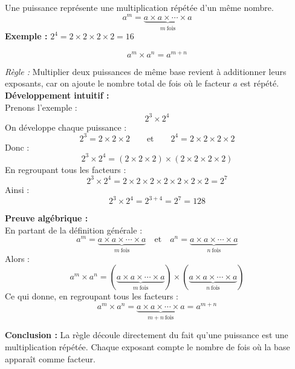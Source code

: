 \documentclass[11pt,a4paper]{article}
\newcommand{\rulebox}[3]{
\begin{tcolorbox}[colback=#1!10!white,colframe=#1!60!black,title=\textbf{#2}]
#3
\end{tcolorbox}
}
\begin{document}
\rulebox{orange}{Définition d’une puissance}{
Une puissance représente une multiplication répétée d’un même nombre.\\[0.2cm]
\[
a^m = \underbrace{a \times a \times \cdots \times a}_{m\ \text{fois}}
\]
\textbf{Exemple : } $2^4 = 2\times2\times2\times2 = 16$
}

\rulebox{orange}{Produit de puissances de même base}{
\[
a^m \times a^n = a^{m+n}
\]

\textit{Règle :}  
Multiplier deux puissances de même base revient à additionner leurs exposants, car on ajoute le nombre total de fois où le facteur $a$ est répété.\\[0.3cm]

\textbf{Développement intuitif :}\\[0.2cm]
Prenons l’exemple :
\[
2^3 \times 2^4
\]
On développe chaque puissance :
\[
2^3 = 2 \times 2 \times 2 \qquad \text{et} \qquad 2^4 = 2 \times 2 \times 2 \times 2
\]
Donc :
\[
2^3 \times 2^4 = (2 \times 2 \times 2) \times (2 \times 2 \times 2 \times 2)
\]
En regroupant tous les facteurs :
\[
2^3 \times 2^4 = 2 \times 2 \times 2 \times 2 \times 2 \times 2 \times 2 = 2^7
\]
Ainsi :
\[
2^3 \times 2^4 = 2^{3+4} = 2^7 = 128
\]

\textbf{Preuve algébrique :}\\[0.2cm]
En partant de la définition générale :
\[
a^m = \underbrace{a \times a \times \cdots \times a}_{m\ \text{fois}} \quad \text{et} \quad a^n = \underbrace{a \times a \times \cdots \times a}_{n\ \text{fois}}
\]
Alors :
\[
a^m \times a^n = (\underbrace{a \times a \times \cdots \times a}_{m\ \text{fois}}) \times (\underbrace{a \times a \times \cdots \times a}_{n\ \text{fois}})
\]
Ce qui donne, en regroupant tous les facteurs :
\[
a^m \times a^n = \underbrace{a \times a \times \cdots \times a}_{m+n\ \text{fois}} = a^{m+n}
\]

\textbf{Conclusion :}  
La règle découle directement du fait qu’une puissance est une multiplication répétée.  
Chaque exposant compte le nombre de fois où la base apparaît comme facteur.
}
\end{document}

